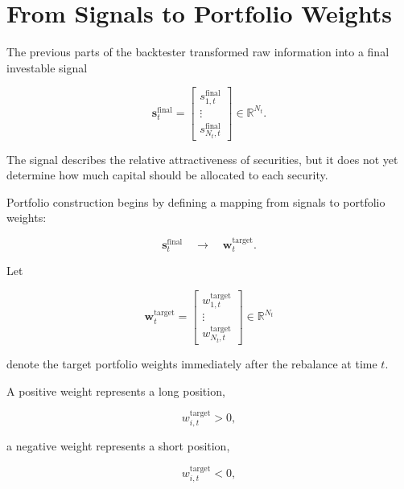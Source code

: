 \documentclass[11pt,a4paper]{article}
\begin{document}
\section{From Signals to Portfolio Weights}
\label{sec:signals_to_weights}

The previous parts of the backtester transformed raw information into a final
investable signal

\begin{equation}
\mathbf{s}_t^{\mathrm{final}}
=
\begin{bmatrix}
s_{1,t}^{\mathrm{final}}
\\
\vdots
\\
s_{N_t,t}^{\mathrm{final}}
\end{bmatrix}
\in
\mathbb{R}^{N_t}.
\end{equation}

The signal describes the relative attractiveness of securities, but it does not
yet determine how much capital should be allocated to each security.

Portfolio construction begins by defining a mapping from signals to portfolio
weights:

\begin{equation}
\boxed{
\mathbf{s}_t^{\mathrm{final}}
\quad
\longrightarrow
\quad
\mathbf{w}_t^{\mathrm{target}}.
}
\end{equation}

Let

\begin{equation}
\mathbf{w}_t^{\mathrm{target}}
=
\begin{bmatrix}
w_{1,t}^{\mathrm{target}}
\\
\vdots
\\
w_{N_t,t}^{\mathrm{target}}
\end{bmatrix}
\in
\mathbb{R}^{N_t}
\end{equation}

denote the target portfolio weights immediately after the rebalance at time
$t$.

A positive weight represents a long position,

\begin{equation}
w_{i,t}^{\mathrm{target}}>0,
\end{equation}

a negative weight represents a short position,

\begin{equation}
w_{i,t}^{\mathrm{target}}<0,
\end{equation}
\end{document}
